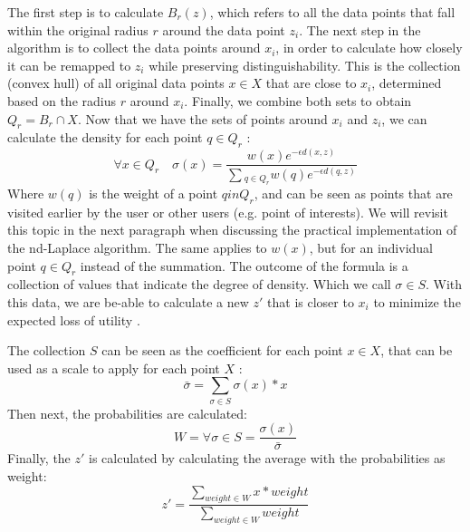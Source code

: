 The first step is to calculate $B_r(z)$, which refers to all the data points that fall within the original radius $r$ around the data point $z_i$.
The next step in the algorithm is to collect the data points around $x_i$, in order to calculate how closely it can be remapped to $z_i$ while preserving distinguishability.
This is the collection (convex hull) of all original data points $x \in X$ that are close to $x_i$, determined based on the radius $r$ around $x_i$.
Finally, we combine both sets to obtain $Q_r = B_r \cap X$.
Now that we have the sets of points around $x_i$ and $z_i$, we can calculate the density for each point $q \in Q_r$ \citep{chatzikokolakis_efficient_2017}:
\begin{equation}
  \forall x \in Q_r \quad \sigma(x) = \frac{w(x)e^{-\epsilon d(x, z)}}{\sum{_{q\in Q_r} w(q)e^{-\epsilon d(q, z)}}}
  \label{eq:optimal-remapping-formula-1}
\end{equation}
Where $w(q)$ is the weight of a point $q in Q_r$, and can be seen as points that are visited earlier by the user or other users (e.g. point of interests).
We will revisit this topic in the next paragraph when discussing the practical implementation of the nd-Laplace algorithm.
The same applies to $w(x)$, but for an individual point $q \in Q_r$ instead of the summation.
The outcome of the formula is a collection of values that indicate the degree of density. Which we call $\sigma \in S$.
With this data, we are be-able to calculate a new $z'$ that is closer to $x_i$ to minimize the expected loss of utility \citep{chatzikokolakis_efficient_2017}.

The collection $S$ can be seen as the coefficient for each point $x \in X$, that can be used as a scale to apply for each point $X$ \citep{chatzikokolakis_efficient_2017}:
\begin{equation}
  \bar{\sigma} = \sum_{\sigma \in S} \sigma(x) * x
  \label{eq:optimal-remapping-formula-2}
\end{equation}
Then next, the probabilities are calculated:
\begin{equation}
  W = \forall \sigma \in S = \frac{\sigma(x)}{\bar{\sigma}}
  \label{eq:optimal-remapping-formula-3}
\end{equation}
Finally, the $z'$ is calculated by calculating the average with the probabilities as weight:
\begin{equation}
  z' = \frac{\sum_{weight \in W} x * weight }{\sum_{weight \in W} weight}
  \label{eq:optimal-remapping-formula-4}
\end{equation}

